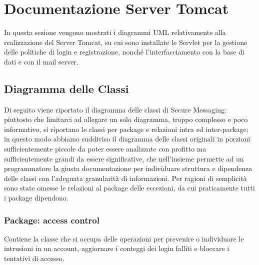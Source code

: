 
\textual


\section{Documentazione Server Tomcat}

In questa sezione vengono mostrati i diagrammi UML relativamente alla realizzazione del Server Tomcat, su cui sono installate le Servlet per la gestione delle politiche di login e registrazione, nonché l'interfacciamento con la base di dati e con il mail server.

\subsection{Diagramma delle Classi}

Di seguito viene riportato il diagramma delle classi di Secure Messaging: piuttosto che limitarci ad allegare un solo diagramma, troppo complesso e poco informativo, si riportano le classi per package e relazioni intra ed inter-package; in questo modo abbiamo suddiviso il diagramma delle classi originali in porzioni sufficientemente piccole da poter essere analizzate con profitto ma sufficientemente grandi da essere significative, che nell’insieme permette ad un programmatore la giusta documentazione per individuare struttura e dipendenza delle classi con l’adeguata granularità di informazioni.
Per ragioni di semplicità sono state omesse le relazioni al package delle eccezioni, da cui praticamente tutti i package dipendono.

\subsubsection{Package: \textbf{access control}}

Contiene la classe che si occupa delle operazioni per prevenire o individuare le intrusioni in un account, aggiornare i conteggi dei login falliti e bloccare i tentativi di accesso.

